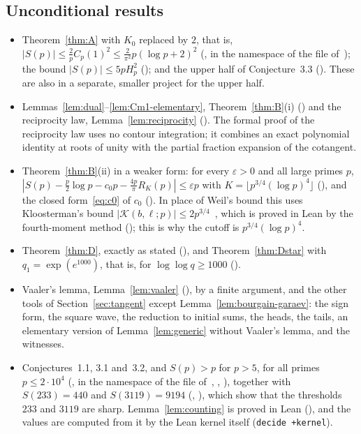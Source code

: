 \subsection*{Unconditional results}
\begin{itemize}[leftmargin=*]
\item Theorem~\ref{thm:A} with $K_0$ replaced by $2$, that is, $|S(p)|\le\frac2pC_p(1)^2\le\frac2{\pi^2}p(\log p+2)^2$ (, in the namespace of the file of~\cite{b11}); the bound $|S(p)|\le5pH_p^2$ (); and the upper half of Conjecture~3.3 (). These are also in a separate, smaller project for the upper half.
\item Lemmas~\ref{lem:dual}--\ref{lem:Cm1-elementary}, Theorem~\ref{thm:B}(i) () and the reciprocity law, Lemma~\ref{lem:reciprocity} (). The formal proof of the reciprocity law uses no contour integration; it combines an exact polynomial identity at roots of unity with the partial fraction expansion of the cotangent.
\item Theorem~\ref{thm:B}(ii) in a weaker form: for every $\varepsilon>0$ and all large primes $p$, $|S(p)-\frac p2\log p-c_0p-\frac{4p}\pi R_K(p)|\le\varepsilon p$ with $K=\lfloor p^{3/4}(\log p)^4\rfloor$ (), and the closed form~\eqref{eq:c0} of $c_0$ (). In place of Weil's bound this uses Kloosterman's bound $|\mathcal K(b,\ell;p)|\le2p^{3/4}$~\cite{b36}, which is proved in Lean by the fourth-moment method (); this is why the cutoff is $p^{3/4}(\log p)^4$.
\item Theorem~\ref{thm:D}, exactly as stated (), and Theorem~\ref{thm:Dstar} with $q_1=\exp(e^{1000})$, that is, for $\log\log q\ge1000$ ().
\item Vaaler's lemma, Lemma~\ref{lem:vaaler} (), by a finite argument, and the other tools of Section~\ref{sec:tangent} except Lemma~\ref{lem:bourgain-garaev}: the sign form, the square wave, the reduction to initial sums, the heads, the tails, an elementary version of Lemma~\ref{lem:generic} without Vaaler's lemma, and the witnesses.
\item Conjectures~1.1, 3.1 and~3.2, and $S(p)>p$ for $p>5$, for all primes $p\le2\cdot10^4$ (,  in the namespace of the file of~\cite{b11}, , ), together with $S(233)=440$ and $S(3119)=9194$ (, ), which show that the thresholds $233$ and $3119$ are sharp. Lemma~\ref{lem:counting} is proved in Lean (), and the values are computed from it by the Lean kernel itself (\texttt{decide +kernel}).
\end{itemize}

